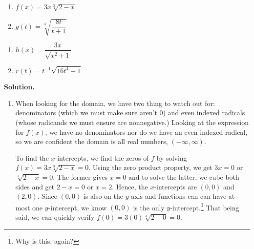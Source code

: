 \documentclass{ximera}
\begin{document}
\begin{ex}
\begin{itemize}
\end{itemize}

\begin{multicols}{2}
\begin{enumerate}

\item  $f(x) = 3x \sqrt[3]{2-x}$ 

\item  $g(t) = \sqrt[3]{\dfrac{8t}{t+1}}$

\setcounter{HW}{\value{enumi}}
\end{enumerate}
\end{multicols}

\begin{multicols}{2}
\begin{enumerate}
\setcounter{enumi}{\value{HW}}

\item  $h(x) = \dfrac{3x}{\sqrt{x^2 + 1}}$

\item  $r(t) = t^{-1} \sqrt{16t^4-1}$ 

\setcounter{HW}{\value{enumi}}
\end{enumerate}
\end{multicols}


{\bf Solution.} 

\begin{enumerate}

\item  When looking for the domain, we have two thing to watch out for:  denominators (which we must make sure aren't $0$) and even indexed radicals (whose radicands we must ensure are nonnegative.)  Looking at the expression for $f(x)$, we have no denominators nor do we have an even indexed radical, so we are confident the domain is all real numbers, $(-\infty, \infty)$. 

To find the $x$-intercepts, we find the zeros of $f$ by solving $f(x) =  3x \sqrt[3]{2-x} = 0$.  Using the zero product property, we get $3x = 0$ or $\sqrt[3]{2-x} = 0$.  The former gives $x = 0$ and to solve the latter, we cube both sides and get $2 - x = 0$ or $x = 2$.  Hence, the $x$-intercepts are $(0,0)$ and $(2,0)$.  Since $(0,0)$ is also on the $y$-axis and functions can can have at most one $y$-intercept, we know $(0,0)$ is the only $y$-intercept.\footnote{Why is this, again?}  That being said, we can quickly verify $f(0) = 3(0) \sqrt[3]{2-0} = 0$. 


\end{enumerate}
\end{ex}
\end{document}
